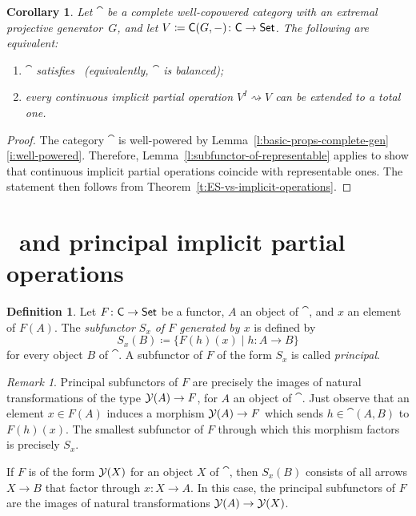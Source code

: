 \documentclass[a4paper,10pt,reqno]{amsart}
\newtheorem{corollary}[theorem]{Corollary}
\theoremstyle{definition}
\newtheorem{definition}[theorem]{Definition}
\theoremstyle{remark}
\newtheorem{remark}[theorem]{Remark}
\begin{document}
\begin{corollary}\label{cor:ES-vs-continuous-operations}
Let $\cat$ be a complete well-copowered category with an extremal projective generator~$G$, and let $V\coloneqq {\sf C}(G,-)\colon{\sf C}\to{\sf Set}$. The following are equivalent:
%
\begin{enumerate}[label=(\arabic*),series=implicitops]
\item\label{i:well-copowered-Cat-satisfies-ES} $\cat$ satisfies \ES~(equivalently, $\cat$ is balanced);
\item\label{i:continuous-admits-extension} every continuous implicit partial operation $V^{I} \rightsquigarrow V$ can be extended to a total one.
\end{enumerate}
\end{corollary}

\begin{proof}
The category $\cat$ is well-powered by Lemma~\ref{l:basic-props-complete-gen}\ref{i:well-powered}. Therefore, Lemma~\ref{l:subfunctor-of-representable} applies to show that continuous implicit partial operations coincide with representable ones. The statement then follows from Theorem~\ref{t:ES-vs-implicit-operations}.
\end{proof}

\section{\SES~and principal implicit partial operations}\label{s:implicit-SES}

\begin{definition}\label{def:principal-subfunctor}
Let $F\colon {\sf C} \to{\sf Set}$ be a functor, $A$ an object of $\cat$, and $x$ an element of $F(A)$. The \emph{subfunctor $S_{x}$ of $F$ generated by $x$} is defined by
\[
S_{x}(B)\coloneqq \{F(h)(x)\mid h\colon A \to B\}
\]
for every object $B$ of $\cat$. 
%
A subfunctor of $F$ of the form $S_x$ is called \emph{principal}.
\end{definition}

\begin{remark}
Principal subfunctors of $F$ are precisely the images of natural transformations of the type $\mathcal{Y}(A)\to F$, for $A$ an object of $\cat$. Just observe that an element $x\in F(A)$ induces a morphism $\mathcal{Y}(A)\to F$ which sends $h\in \cat(A,B)$ to $F(h)(x)$. The smallest subfunctor of $F$ through which this morphism factors is precisely $S_{x}$.

If $F$ is of the form $\mathcal{Y}(X)$ for an object $X$ of $\cat$, then $S_{x}(B)$ consists of all arrows $X\to B$ that factor through $x\colon X\to A$. In this case, the principal subfunctors of $F$ are the images of natural transformations $\mathcal{Y}(A) \to\mathcal{Y}(X)$. 
\end{remark}
\end{document}
